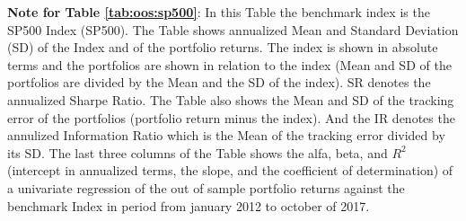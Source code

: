 \documentclass[preprint, doubleblind, authoryear,10pt]{elsarticle}
\begin{document}
\begin{singlespace}
{\footnotesize
\textbf{Note for Table \ref{tab:oos:sp500}}:
In this Table the benchmark index is the SP500 Index (SP500).
The Table shows annualized Mean and Standard Deviation (SD) of the Index and of the portfolio returns.
The index is shown in absolute terms and the portfolios are shown in relation to the index (Mean and SD of the portfolios are divided by the Mean and the SD of the index).
SR denotes the annualized Sharpe Ratio.
The Table also shows the Mean and SD of the tracking error of the portfolios (portfolio return minus the index).
And the IR denotes the annulized Information Ratio which is the Mean of the tracking error divided by its SD.
The last three columns of the Table shows the alfa, beta, and $R^2$ (intercept in annualized terms, the slope, and the coefficient of determination) of a univariate regression of the out of sample portfolio returns against the benchmark Index in period from january 2012 to october of 2017.}
\end{singlespace}

\clearpage
\end{document}
